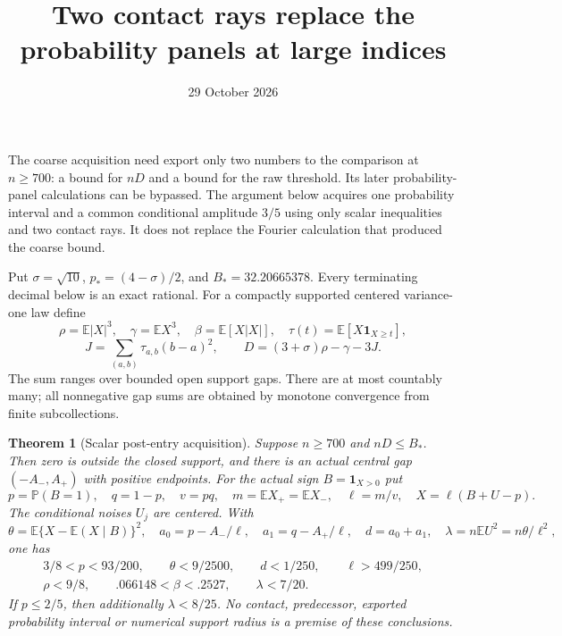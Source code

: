 \documentclass[11pt]{article}
\title{Two contact rays replace the probability panels at large indices}
\author{}\date{29 October 2026}
\newcommand{\E}{\mathbb E}\newcommand{\Pp}{\mathbb P}
\newtheorem{theorem}{Theorem}\newtheorem{lemma}[theorem]{Lemma}
\begin{document}
\maketitle

The coarse acquisition need export only two numbers to the comparison at
$n\ge700$: a bound for $nD$ and a bound for the raw threshold. Its later
probability-panel calculations can be bypassed. The argument below acquires
one probability interval and a common conditional amplitude $3/5$ using
only scalar inequalities and two contact rays. It does not replace the
Fourier calculation that produced the coarse bound.

Put $\sigma=\sqrt{10}$, $p_*=(4-\sigma)/2$, and
$B_*=32.20665378$. Every terminating decimal below is an exact rational.
For a compactly supported centered variance-one law define
\[
 \rho=\E|X|^3,\quad\gamma=\E X^3,\quad\beta=\E[X|X|],\quad
 \tau(t)=\E[X\mathbf1_{X\ge t}],
\]
\[
 J=\sum_{(a,b)}\tau_{a,b}(b-a)^2,\qquad D=(3+\sigma)\rho-\gamma-3J.
\]
The sum ranges over bounded open support gaps. There are at most countably
many; all nonnegative gap sums are obtained by monotone convergence from
finite subcollections.

\begin{theorem}[Scalar post-entry acquisition]\label{a:main}
Suppose $n\ge700$ and $nD\le B_*$. Then zero is outside the closed support,
and there is an actual central gap $(-A_-,A_+)$ with positive endpoints.
For the actual sign $B=\mathbf1_{X>0}$ put
\[
 p=\Pp(B=1),\quad q=1-p,\quad v=pq,\quad m=\E X_+=\E X_-,\quad
 \ell=m/v,\quad X=\ell(B+U-p).
\]
The conditional noises $U_j$ are centered. With
\[
 \theta=\E\{X-\E(X\mid B)\}^2,\quad
 a_0=p-A_-/\ell,\quad a_1=q-A_+/\ell,\quad d=a_0+a_1,
 \quad\lambda=n\E U^2=n\theta/\ell^2,
\]
one has
\begin{gather}
 3/8<p<93/200,\qquad \theta<9/2500,\qquad d<1/250,
 \qquad \ell>499/250,\label{a:small}\\
 \rho<9/8,\qquad .066148<\beta<.2527,\qquad
 \lambda<7/20.\label{a:out}
\end{gather}
If $p\le2/5$, then additionally $\lambda<8/25$.
No contact, predecessor, exported probability interval or numerical support
radius is a premise of these conclusions.
\end{theorem}
\end{document}
